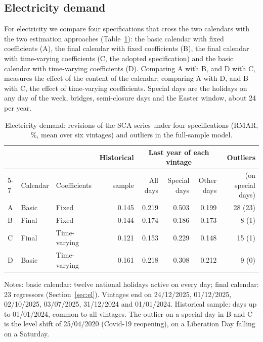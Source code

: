 \documentclass[Afour, times]{sagej}
\begin{document}
\subsection{Electricity demand}
\label{subsec:rev_el}

For electricity we compare four specifications that cross the two calendars with the two estimation approaches (Table~\ref{tab:rev_el}): the basic calendar with fixed coefficients (A), the final calendar with fixed coefficients (B), the final calendar with time-varying coefficients (C, the adopted specification) and the basic calendar with time-varying coefficients (D). Comparing A with B, and D with C, measures the effect of the content of the calendar; comparing A with D, and B with C, the effect of time-varying coefficients. Special days are the holidays on any day of the week, bridges, semi-closure days and the Easter window, about 24 per year.

\begin{table}[t]
\centering
\caption{Electricity demand: revisions of the SCA series under four specifications (RMAR, \%, mean over six vintages) and outliers in the full-sample model.}
\label{tab:rev_el}
\small
\begin{tabular}{@{}l l l r r r r r@{}}
\toprule
 & & & Historical & \multicolumn{3}{c}{Last year of each vintage} & Outliers \\
\cmidrule(lr){5-7}
 & Calendar & Coefficients & sample & All days & Special days & Other days & (on special days) \\
\midrule
A & Basic   & Fixed        & 0.145 & 0.219 & 0.503 & 0.199 & 28 (23) \\
B & Final   & Fixed        & 0.144 & 0.174 & 0.186 & 0.173 & 8 (1) \\
C & Final   & Time-varying & 0.121 & 0.153 & 0.229 & 0.148 & 15 (1) \\
D & Basic   & Time-varying & 0.161 & 0.218 & 0.308 & 0.212 & 9 (0) \\
\bottomrule
\end{tabular}
\begin{minipage}{\textwidth}
\footnotesize
\vspace{4pt}
Notes: basic calendar: twelve national holidays active on every day; final calendar: 23 regressors (Section~\ref{sec:el}). Vintages end on 24/12/2025, 01/12/2025, 02/10/2025, 03/07/2025, 31/12/2024 and 01/01/2024. Historical sample: days up to 01/01/2024, common to all vintages. The outlier on a special day in B and C is the level shift of 25/04/2020 (Covid-19 reopening), on a Liberation Day falling on a Saturday.
\end{minipage}
\end{table}
\end{document}
